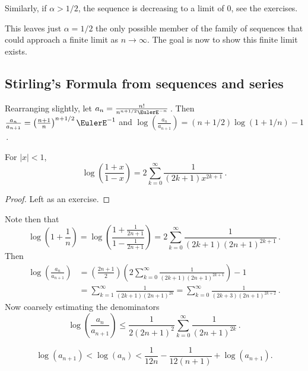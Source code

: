 \documentclass[12pt]{article}
\begin{document}
Similarly, if \( \alpha > 1/2 \), the sequence is decreasing to a limit
of \( 0 \), see the exercises.

This leaves just \( \alpha =1/2 \) the only possible member of the
family of sequences that could approach a finite limit as \( n \to
\infty \). The goal is now to show this finite limit exists.

\subsection*{Stirling's Formula from sequences and series}

Rearranging slightly, let \( a_n = \frac{n!} {n^{n+1/2}\EulerE^{-n}} \)\,.
Then \( \frac{a_n}{a_{n+1}} = \left(\frac{n+1}{n} \right)^{n + 1/2}\EulerE^
{-1} \) and \( \log \left( \frac{a_n}{a_{n+1}} \right) = (n+1/2) \log( 1
+ 1/n) - 1 \)\,.

\begin{lemma}
    For \( |x| < 1 \),
    \[
        \log\left( \frac{1+x}{1-x} \right) = 2 \sum_{k=0}^{\infty} \frac
        {1}{(2k+1)x^{2k+1} }\,.
    \]%
    \label{lem:sequences:lemma1}
\end{lemma}

\begin{proof}
    Left as an exercise.
\end{proof}

Note then that
\[
    \log\left( 1 + \frac{1}{n} \right) = \log\left( \frac{ 1 + \frac{1}{2n+1}}
    {1 - \frac{1}{2n+1}} \right) = 2 \sum_{k=0}^{\infty} \frac{1}{(2k+1)
    (2n+1)^{2k+1}}\,.
\] Then
\begin{align*}
    \log \left(\frac{a_n}{a_{n+1}} \right) &= \left(\frac{2n+1}{2}
    \right) \left(2 \sum_{k=0}^{\infty} \frac{1}{(2k+1)(2n+1)^{2k+1}}
    \right) -1 \\
    &= \sum_{k=1}^{\infty} \frac{1}{(2k+1)(2n+1)^{2k}} = \sum_{k=0}^{\infty}
    \frac{1}{(2k+3)(2n+1)^{2k+2}}\,.
\end{align*}
Now coarsely estimating the denominators
\[
    \log \left(\frac{a_n}{a_{n+1}} \right) \le \frac{1}{2(2n+1)^2} \sum_
    {k=0}^ {\infty} \frac{1}{(2n+1)^{2k}}\,.
\]

\begin{lemma}
    \[
        \log(a_{n+1} ) < \log \left(a_n \right) < \frac{1}{12n} - \frac{1}
        {12(n+1)} + \log(a_{n+1} ).
    \]%
    \label{lem:sequences:lemma2}
\end{lemma}
\end{document}
